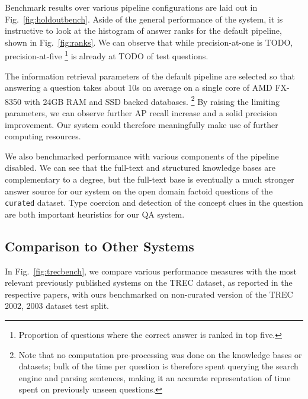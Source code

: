 Benchmark results over various pipeline configurations are laid out in Fig.~\ref{fig:holdoutbench}.
Aside of the general performance of the system,
it is instructive to look at the histogram of answer ranks
for the default pipeline, shown in Fig.~\ref{fig:ranks}.
We can observe that while precision-at-one is TODO,
precision-at-five%
\footnote{Proportion of questions where the correct answer is ranked in top five.}
is already at TODO of test questions.

The information retrieval parameters of the default pipeline are selected so
that answering a question takes about 10s on average on a single core of
AMD FX-8350 with 24GB RAM and SSD backed databases.%
\footnote{Note that no computation pre-processing was done on the knowledge bases or datasets;
bulk of the time per question is therefore spent querying the search engine and parsing sentences,
making it an accurate representation of time spent on previously unseen questions.}
By raising the limiting
parameters, we can observe further AP recall increase and a solid precision improvement.
Our system could therefore meaningfully make use of further computing resources.

We also benchmarked performance with various components of the pipeline
disabled.  We can see that the full-text and structured knowledge bases
are complementary to a degree, but the full-text base is eventually
a much stronger answer source for our system on the open domain factoid
questions of the \texttt{curated} dataset.  Type coercion and detection
of the concept clues in the question are both important heuristics for
our QA system.

\subsection{Comparison to Other Systems}

In Fig.~\ref{fig:trecbench}, we compare various performance measures
with the most relevant previously published systems
on the TREC dataset, as reported in the respective papers,
with ours benchmarked on non-curated version of the TREC 2002, 2003 dataset test split.

